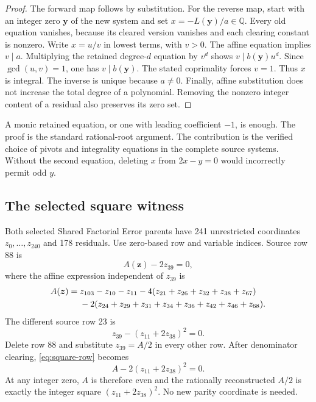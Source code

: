 \documentclass[11pt]{article}
\theoremstyle{remark}\newtheorem{remark}[theorem]{Remark}
\newcommand{\Q}{\mathbb Q}
\begin{document}
\begin{proof}
The forward map follows by substitution. For the reverse map, start with
an integer zero $\boldsymbol y$ of the new system and set
$x=-L(\boldsymbol y)/a\in\Q$. Every old equation vanishes, because its
cleared version vanishes and each clearing constant is nonzero.
Write $x=u/v$ in lowest terms, with $v>0$. The affine equation implies
$v\mid a$. Multiplying the retained degree-$d$ equation by $v^d$ shows
$v\mid b(\boldsymbol y)u^d$. Since $\gcd(u,v)=1$, one has
$v\mid b(\boldsymbol y)$. The stated coprimality forces $v=1$.
Thus $x$ is integral. The inverse is unique because $a\ne0$.
Finally, affine substitution does not increase the total degree of a
polynomial. Removing the nonzero integer content of a residual also
preserves its zero set.
\end{proof}

A monic retained equation, or one with leading coefficient $-1$, is
enough. The proof is the standard rational-root argument. The contribution
is the verified choice of pivots and integrality equations in the
complete source systems. Without the second equation, deleting $x$ from
$2x-y=0$ would incorrectly permit odd $y$.

\subsection{The selected square witness}

Both selected Shared Factorial Error parents have 241 unrestricted
coordinates $z_0,\ldots,z_{240}$ and 178 residuals. Use zero-based row and
variable indices. Source row 88 is
\[
A(\boldsymbol z)-2z_{39}=0,
\]
where the affine expression independent of $z_{39}$ is
\begin{align}
A(\boldsymbol z)={}&z_{103}-z_{10}-z_{11}
 -4(z_{21}+z_{26}+z_{32}+z_{38}+z_{67})\notag\\
&-2(z_{24}+z_{29}+z_{31}+z_{34}+z_{36}
      +z_{42}+z_{46}+z_{68}).\label{eq:A}
\end{align}
The different source row 23 is
\begin{equation}\label{eq:square-row}
z_{39}-(z_{11}+2z_{38})^2=0.
\end{equation}
Delete row 88 and substitute $z_{39}=A/2$ in every other row.
After denominator clearing, \eqref{eq:square-row} becomes
\begin{equation}\label{eq:integrality-row}
A-2(z_{11}+2z_{38})^2=0.
\end{equation}
At any integer zero, $A$ is therefore even and the rationally reconstructed
$A/2$ is exactly the integer square $(z_{11}+2z_{38})^2$.
No new parity coordinate is needed.
\end{document}
